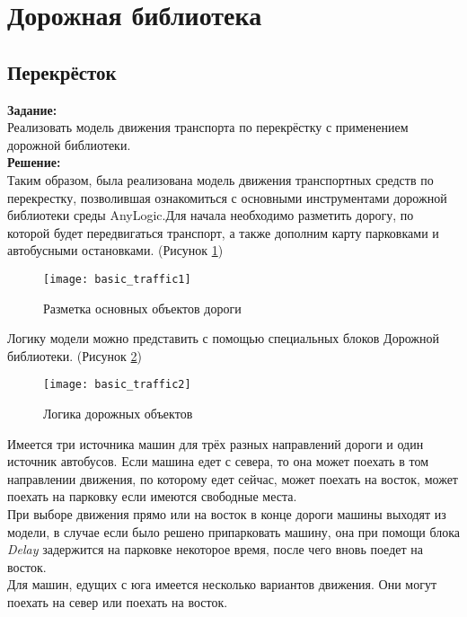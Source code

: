 \section*{Дорожная библиотека}
\subsection*{Перекрёсток}

\textbf{Задание:}\\
Реализовать модель движения транспорта по перекрёстку с применением дорожной библиотеки.\\

\textbf{Решение:}\\
Таким образом, была реализована модель движения транспортных средств по перекрестку, позволившая ознакомиться с основными инструментами дорожной библиотеки среды AnyLogic.Для начала необходимо разметить дорогу, по которой будет передвигаться транспорт, а также дополним карту парковками и автобусными остановками. (Рисунок \ref{fig:basic_traffic1})
\begin{figure}[h]
	\centering \texttt{[image: basic\_traffic1]}
	\caption{Разметка основных объектов дороги}
	\label{fig:basic_traffic1}
\end{figure}

\newpage

Логику модели можно представить с помощью специальных блоков Дорожной библиотеки. (Рисунок \ref{fig:basic_traffic2})
\begin{figure}[h]
	\centering \texttt{[image: basic\_traffic2]}
	\caption{Логика дорожных объектов}
	\label{fig:basic_traffic2}
\end{figure}

Имеется три источника машин для трёх разных направлений дороги и один источник автобусов. Если машина едет с севера, то она может поехать в том направлении движения, по которому едет сейчас, может поехать на восток, может поехать на парковку если имеются свободные места.\\

При выборе движения прямо или на восток в конце дороги машины выходят из модели, в случае если было решено припарковать машину, она при помощи блока \textit{Delay} задержится на парковке некоторое время, после чего вновь поедет на восток.\\

Для машин, едущих с юга имеется несколько вариантов движения. Они могут поехать на север или поехать на восток.\\


